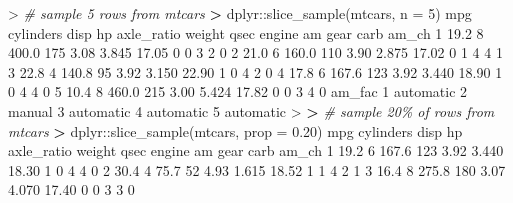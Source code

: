 \documentclass[
]{book}
\newenvironment{Shaded}{\begin{snugshade}}{\end{snugshade}}
\newcommand{\AttributeTok}[1]{\textcolor[rgb]{0.77,0.63,0.00}{#1}}
\newcommand{\CommentTok}[1]{\textcolor[rgb]{0.56,0.35,0.01}{\textit{#1}}}
\newcommand{\DecValTok}[1]{\textcolor[rgb]{0.00,0.00,0.81}{#1}}
\newcommand{\ErrorTok}[1]{\textcolor[rgb]{0.64,0.00,0.00}{\textbf{#1}}}
\newcommand{\FloatTok}[1]{\textcolor[rgb]{0.00,0.00,0.81}{#1}}
\newcommand{\FunctionTok}[1]{\textcolor[rgb]{0.00,0.00,0.00}{#1}}
\newcommand{\NormalTok}[1]{#1}
\newcommand{\SpecialCharTok}[1]{\textcolor[rgb]{0.00,0.00,0.00}{#1}}
\begin{document}
\begin{Shaded}
\begin{Highlighting}[]
\SpecialCharTok{\textgreater{}} \CommentTok{\# sample 5 rows from mtcars}
\ErrorTok{\textgreater{}}\NormalTok{ dplyr}\SpecialCharTok{::}\FunctionTok{slice\_sample}\NormalTok{(mtcars, }\AttributeTok{n =} \DecValTok{5}\NormalTok{)}
\NormalTok{   mpg cylinders  disp  hp axle\_ratio weight  qsec engine am gear carb am\_ch}
\DecValTok{1} \FloatTok{19.2}         \DecValTok{8} \FloatTok{400.0} \DecValTok{175}       \FloatTok{3.08}  \FloatTok{3.845} \FloatTok{17.05}      \DecValTok{0}  \DecValTok{0}    \DecValTok{3}    \DecValTok{2}     \DecValTok{0}
\DecValTok{2} \FloatTok{21.0}         \DecValTok{6} \FloatTok{160.0} \DecValTok{110}       \FloatTok{3.90}  \FloatTok{2.875} \FloatTok{17.02}      \DecValTok{0}  \DecValTok{1}    \DecValTok{4}    \DecValTok{4}     \DecValTok{1}
\DecValTok{3} \FloatTok{22.8}         \DecValTok{4} \FloatTok{140.8}  \DecValTok{95}       \FloatTok{3.92}  \FloatTok{3.150} \FloatTok{22.90}      \DecValTok{1}  \DecValTok{0}    \DecValTok{4}    \DecValTok{2}     \DecValTok{0}
\DecValTok{4} \FloatTok{17.8}         \DecValTok{6} \FloatTok{167.6} \DecValTok{123}       \FloatTok{3.92}  \FloatTok{3.440} \FloatTok{18.90}      \DecValTok{1}  \DecValTok{0}    \DecValTok{4}    \DecValTok{4}     \DecValTok{0}
\DecValTok{5} \FloatTok{10.4}         \DecValTok{8} \FloatTok{460.0} \DecValTok{215}       \FloatTok{3.00}  \FloatTok{5.424} \FloatTok{17.82}      \DecValTok{0}  \DecValTok{0}    \DecValTok{3}    \DecValTok{4}     \DecValTok{0}
\NormalTok{     am\_fac}
\DecValTok{1}\NormalTok{ automatic}
\DecValTok{2}\NormalTok{    manual}
\DecValTok{3}\NormalTok{ automatic}
\DecValTok{4}\NormalTok{ automatic}
\DecValTok{5}\NormalTok{ automatic}
\SpecialCharTok{\textgreater{}} 
\ErrorTok{\textgreater{}} \CommentTok{\# sample 20\% of rows from mtcars}
\ErrorTok{\textgreater{}}\NormalTok{ dplyr}\SpecialCharTok{::}\FunctionTok{slice\_sample}\NormalTok{(mtcars, }\AttributeTok{prop =} \FloatTok{0.20}\NormalTok{)}
\NormalTok{   mpg cylinders  disp  hp axle\_ratio weight  qsec engine am gear carb am\_ch}
\DecValTok{1} \FloatTok{19.2}         \DecValTok{6} \FloatTok{167.6} \DecValTok{123}       \FloatTok{3.92}  \FloatTok{3.440} \FloatTok{18.30}      \DecValTok{1}  \DecValTok{0}    \DecValTok{4}    \DecValTok{4}     \DecValTok{0}
\DecValTok{2} \FloatTok{30.4}         \DecValTok{4}  \FloatTok{75.7}  \DecValTok{52}       \FloatTok{4.93}  \FloatTok{1.615} \FloatTok{18.52}      \DecValTok{1}  \DecValTok{1}    \DecValTok{4}    \DecValTok{2}     \DecValTok{1}
\DecValTok{3} \FloatTok{16.4}         \DecValTok{8} \FloatTok{275.8} \DecValTok{180}       \FloatTok{3.07}  \FloatTok{4.070} \FloatTok{17.40}      \DecValTok{0}  \DecValTok{0}    \DecValTok{3}    \DecValTok{3}     \DecValTok{0}

\end{Highlighting}
\end{Shaded}
\end{document}
